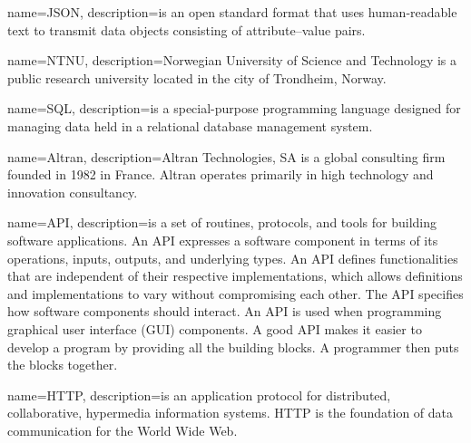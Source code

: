 \documentclass[../document]{subfiles}
\begin{document}
 {
   name=JSON,
   description={is an open standard format that uses human-readable text to transmit data objects consisting of attribute–value pairs.}
}

{
   name=NTNU,
   description={Norwegian University of Science and Technology is a public research university located in the city of Trondheim, Norway.}
}

{
   name=SQL,
   description={is a special-purpose programming language designed for managing data held in a relational database management system.}
}

{
   name=Altran,
   description={Altran Technologies, SA is a global consulting firm founded in 1982 in France. Altran operates primarily in high technology and innovation consultancy.}
}

{
   name=API,
   description={is a set of routines, protocols, and tools for building software applications. An API expresses a software component in terms of its operations, inputs, outputs, and underlying types. An API defines functionalities that are independent of their respective implementations, which allows definitions and implementations to vary without compromising each other. The API specifies how software components should interact. An API is used when programming graphical user interface (GUI) components. A good API makes it easier to develop a program by providing all the building blocks. A programmer then puts the blocks together.}
}

{
   name=HTTP,
   description={is an application protocol for distributed, collaborative, hypermedia information systems. HTTP is the foundation of data communication for the World Wide Web.}
}
\end{document}
